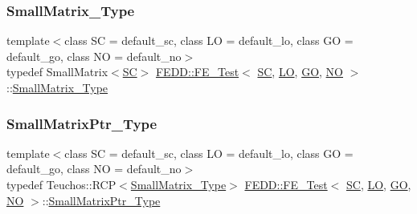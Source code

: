 \mbox{\label{classFEDD_1_1FE__Test_a11f3375e690a493e9076b63b0f86edf4}} 
\subsubsection{\texorpdfstring{Small\+Matrix\+\_\+\+Type}{SmallMatrix\_Type}}
{\footnotesize\ttfamily template$<$class SC  = default\+\_\+sc, class LO  = default\+\_\+lo, class GO  = default\+\_\+go, class NO  = default\+\_\+no$>$ \\
typedef Small\+Matrix$<$\hyperlink{fe__test__laplace_8cpp_a79c7e86a57edbb2a5a53242bcd04e41e}{SC}$>$ \hyperlink{classFEDD_1_1FE__Test}{F\+E\+D\+D\+::\+F\+E\+\_\+\+Test}$<$ \hyperlink{fe__test__laplace_8cpp_a79c7e86a57edbb2a5a53242bcd04e41e}{SC}, \hyperlink{fe__test__laplace_8cpp_ad6a38c9f07d3fd633eefca5bccad8410}{LO}, \hyperlink{fe__test__laplace_8cpp_afa2946b509009b4f45eb04bd8c5b27d9}{GO}, \hyperlink{fe__test__laplace_8cpp_a5e24f37b28787429872b6ecb1d0417ce}{NO} $>$\+::\hyperlink{classFEDD_1_1FE__Test_a11f3375e690a493e9076b63b0f86edf4}{Small\+Matrix\+\_\+\+Type}}

\mbox{\label{classFEDD_1_1FE__Test_a675b52d9e58407c6baadb403394be92b}} 
\subsubsection{\texorpdfstring{Small\+Matrix\+Ptr\+\_\+\+Type}{SmallMatrixPtr\_Type}}
{\footnotesize\ttfamily template$<$class SC  = default\+\_\+sc, class LO  = default\+\_\+lo, class GO  = default\+\_\+go, class NO  = default\+\_\+no$>$ \\
typedef Teuchos\+::\+R\+CP$<$\hyperlink{classFEDD_1_1FE__Test_a11f3375e690a493e9076b63b0f86edf4}{Small\+Matrix\+\_\+\+Type}$>$ \hyperlink{classFEDD_1_1FE__Test}{F\+E\+D\+D\+::\+F\+E\+\_\+\+Test}$<$ \hyperlink{fe__test__laplace_8cpp_a79c7e86a57edbb2a5a53242bcd04e41e}{SC}, \hyperlink{fe__test__laplace_8cpp_ad6a38c9f07d3fd633eefca5bccad8410}{LO}, \hyperlink{fe__test__laplace_8cpp_afa2946b509009b4f45eb04bd8c5b27d9}{GO}, \hyperlink{fe__test__laplace_8cpp_a5e24f37b28787429872b6ecb1d0417ce}{NO} $>$\+::\hyperlink{classFEDD_1_1FE__Test_a675b52d9e58407c6baadb403394be92b}{Small\+Matrix\+Ptr\+\_\+\+Type}}




